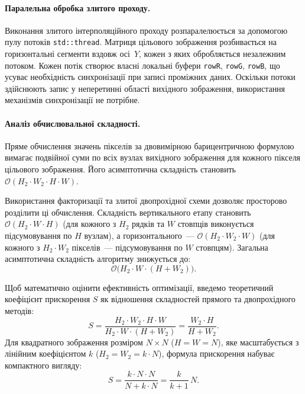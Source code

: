 \paragraph{Паралельна обробка злитого проходу.}
Виконання злитого інтерполяційного проходу розпаралелюється за допомогою
пулу потоків \texttt{std::thread}. Матриця цільового зображення
розбивається на горизонтальні сегменти вздовж осі~$Y$, кожен з яких
обробляється незалежним потоком. Кожен потік створює власні локальні
буфери \texttt{rowR}, \texttt{rowG}, \texttt{rowB}, що усуває
необхідність синхронізації при записі проміжних даних. Оскільки потоки
здійснюють запис у неперетинні області вихідного зображення, використання
механізмів синхронізації не потрібне.

\paragraph{Аналіз обчислювальної складності.}
Пряме обчислення значень пікселів за двовимірною барицентричною формулою
вимагає подвійної суми по всіх вузлах вихідного зображення для кожного
пікселя цільового зображення. Його асимптотична складність становить
$\mathcal{O}(H_2 \cdot W_2 \cdot H \cdot W)$.

Використання факторизації та злитої двопрохідної схеми дозволяє
просторово розділити ці обчислення. Складність вертикального етапу
становить $\mathcal{O}(H_2 \cdot W \cdot H)$ (для кожного з $H_2$
рядків та $W$ стовпців виконується підсумовування по $H$ вузлам), а
горизонтального~--- $\mathcal{O}(H_2 \cdot W_2 \cdot W)$ (для кожного з
$H_2 \cdot W_2$ пікселів~--- підсумовування по $W$ стовпцям). Загальна
асимптотична складність алгоритму знижується до:
\begin{equation}
	\mathcal{O}\bigl(H_2 \cdot W \cdot (H + W_2)\bigr).
\end{equation}

Щоб математично оцінити ефективність оптимізації, введемо теоретичний
коефіцієнт прискорення $S$ як відношення складностей прямого та
двопрохідного методів:
\begin{equation}
	S = \frac{H_2 \cdot W_2 \cdot H \cdot W}{H_2 \cdot W \cdot (H + W_2)}
	= \frac{W_2 \cdot H}{H + W_2}.
\end{equation}
Для квадратного зображення розміром $N \times N$ ($H=W=N$), яке
масштабується з лінійним коефіцієнтом $k$ ($H_2=W_2=k \cdot N$),
формула прискорення набуває компактного вигляду:
\begin{equation}
	S = \frac{k \cdot N \cdot N}{N + k \cdot N} = \frac{k}{k+1}\, N.
\end{equation}

